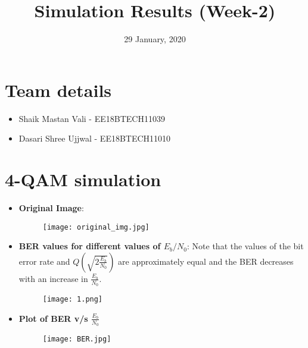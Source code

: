 \documentclass{article}
\title{Simulation Results (Week-2)}
\date{29 January, 2020}
\begin{document}
\maketitle

\section{Team details}
{\begin{itemize}
    \item Shaik Mastan Vali - EE18BTECH11039
    \item Dasari Shree Ujjwal - EE18BTECH11010
\end{itemize}}

\section{4-QAM simulation}
{\begin{itemize}
    \item \textbf{Original Image}:
    \begin{figure}[h]
    \centering
    \texttt{[image: original\_img.jpg]}
    \end{figure}
    
    \item \textbf{BER values for different values of \(E_b/N_0\)}: \newline
    Note that the values of the bit error rate and \(Q(\sqrt{2\frac{E_b}{N_0}})\) are approximately equal and the BER decreases with an increase in \(\frac{E_b}{N_0}\).
    \begin{figure}[!htb]
    \centering
    \texttt{[image: 1.png]}
    \end{figure}
    
    \item \textbf{Plot of BER v/s \(\frac{E_b}{N_0}\)}
    \begin{figure}[!htb]
    \centering
    \texttt{[image: BER.jpg]}
    \end{figure}
\end{itemize}
}
 
\end{document}
